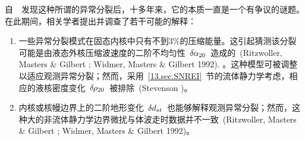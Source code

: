 自~\textcite{masters&gilbert81}~发现这种所谓的异常分裂后，十多年来，它的本质一直是一个有争议的谜题。在此期间，相关学者提出并调查了若干可能的解释：
\begin{enumerate}
\item

一些异常分裂模式在固态内核中只有不到3\%的压缩能量。这引起猜测该分裂可能是由液态外核压缩波速度的二阶不均匀性~$\delta\hspace{-0.1 mm}\alpha_{20}$~造成的~(Ritzwoller, Masters \& Gilbert
\citeyear{ritzwoller&al88}; Widmer, Masters \& Gilbert 1992).
\nocite{widmer&al92}。这种模型可被调整以适应观测异常分裂；然而，采用~\ref{13.sec.SNREI}~节的流体静力学考虑，相应的液核密度变化~$\delta\hspace{-0.2 mm}\rho_{20}$~被排除~(Stevenson \citeyear{stevenson87})。
\item

内核或核幔边界上的二阶地形变化~$\delta\hspace{-0.1 mm}d_{st}$~也能够解释观测异常分裂；然而，这种大的非流体静力学边界微扰与体波走时数据并不一致~(Ritzwoller, Masters \& Gilbert \citeyear{ritzwoller&al88};
Widmer, Masters \& Gilbert 1992)。

\end{enumerate}
